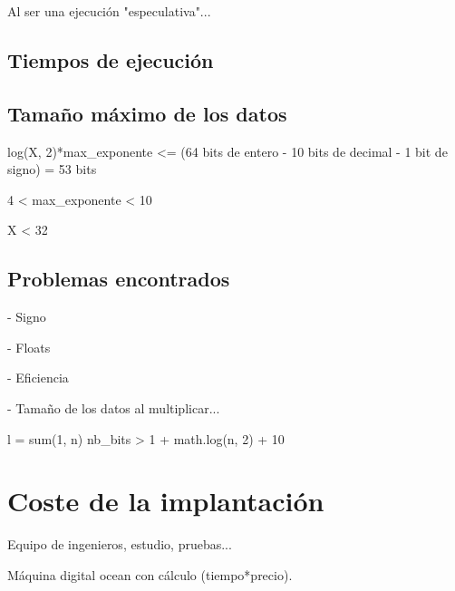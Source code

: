 Al ser una ejecución "especulativa"...

\subsection{Tiempos de ejecución}

\subsection{Tamaño máximo de los datos}

log(X, 2)*max_exponente <= (64 bits de entero - 10 bits de decimal - 1 bit de signo) = 53 bits

4 < max_exponente < 10

X < 32

\subsection{Problemas encontrados}

- Signo

- Floats

- Eficiencia


- Tamaño de los datos al multiplicar...

l = sum(1, n)
nb_bits > 1 + math.log(n, 2) + 10

\section{Coste de la implantación}

Equipo de ingenieros, estudio, pruebas...

Máquina digital ocean con cálculo (tiempo*precio).
